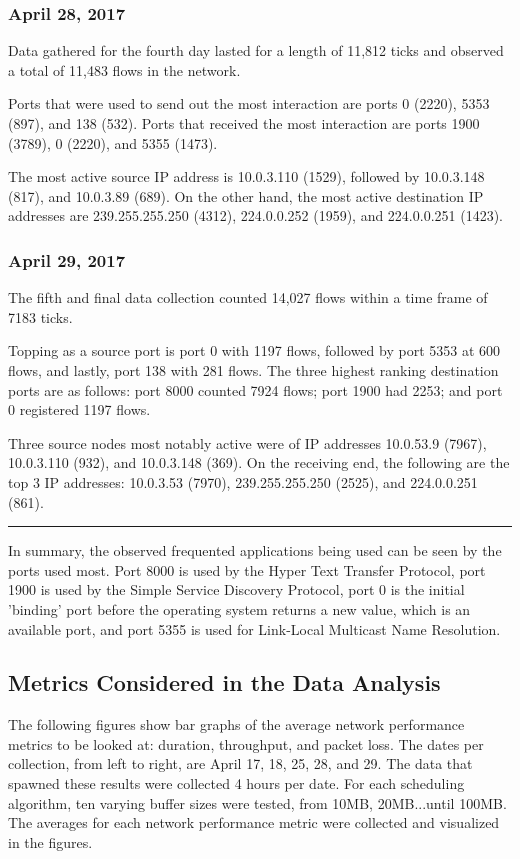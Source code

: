 \documentclass[journal]{IEEE/IEEEtran}
\begin{document}
\subsubsection{\textbf{April 28, 2017}}

Data gathered for the fourth day lasted for a length of 11,812 ticks and observed a total of 11,483 flows in the network.

Ports that were used to send out the most interaction are ports 0 (2220), 5353 (897), and 138 (532). Ports that received the most interaction are ports 1900 (3789), 0 (2220), and 5355 (1473).

The most active source IP address is 10.0.3.110 (1529), followed by 10.0.3.148 (817), and 10.0.3.89 (689). On the other hand, the most active destination IP addresses are 239.255.255.250 (4312), 224.0.0.252 (1959), and 224.0.0.251 (1423).


\subsubsection{\textbf{April 29, 2017}}

The fifth and final data collection counted 14,027 flows within a time frame of 7183 ticks.

Topping as a source port is port 0 with 1197 flows, followed by port 5353 at 600 flows, and lastly, port 138 with 281 flows. The three highest ranking destination ports are as follows: port 8000 counted 7924 flows; port 1900 had 2253; and port 0 registered 1197 flows.

Three source nodes most notably active were of IP addresses 10.0.53.9 (7967), 10.0.3.110 (932), and 10.0.3.148 (369). On the receiving end, the following are the top 3 IP addresses: 10.0.3.53 (7970), 239.255.255.250 (2525), and 224.0.0.251 (861).
\linebreak
\hrule

In summary, the observed frequented applications being used can be seen by the ports used most. Port 8000 is used by the Hyper Text Transfer Protocol, port 1900 is used by the Simple Service Discovery Protocol, port 0 is the initial 'binding' port before the operating system returns a new value, which is an available port, and port 5355 is used for Link-Local Multicast Name Resolution.

\subsection{Metrics Considered in the Data Analysis}
The following figures show bar graphs of the average network performance metrics to be looked at: duration, throughput, and packet loss. The dates per collection, from left to right, are April 17, 18, 25, 28, and 29. The data that spawned these results were collected 4 hours per date. For each scheduling algorithm, ten varying buffer sizes were tested, from 10MB, 20MB...until 100MB. The averages for each network performance metric were collected and visualized in the figures.
\end{document}
